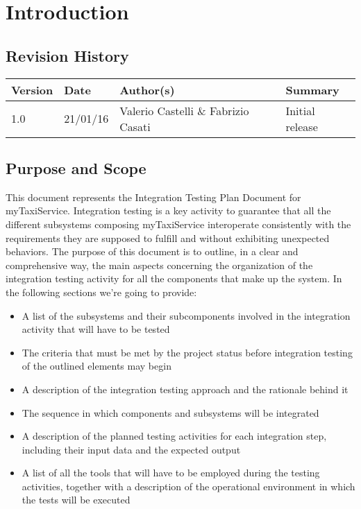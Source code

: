 \chapter{Introduction}
\section{Revision History}
\begin{center}
\begin{longtable}{|l|l|l|l|}
\hline
Version &
Date &
Author(s) &
Summary \\
\hline
1.0 &
21/01/16 &
Valerio Castelli \& Fabrizio Casati &
Initial release \\
\hline
\end{longtable}
\end{center}

\section{Purpose and Scope}
This document represents the Integration Testing Plan Document for myTaxiService. 
Integration testing is a key activity to guarantee that all the different subsystems composing myTaxiService interoperate consistently with the requirements they are supposed to fulfill and without exhibiting unexpected behaviors. 
The purpose of this document is to outline, in a clear and comprehensive way, the main aspects concerning the organization of the integration testing activity for all the components that make up the system.
In the following sections we're going to provide:
\begin{itemize}
	\item A list of the subsystems and their subcomponents involved in the integration activity that will have to be tested
	\item The criteria that must be met by the project status before integration testing of the outlined elements may begin 
	\item A description of the integration testing approach and the rationale behind it
	\item The sequence in which components and subsystems will be integrated 
	\item A description of the planned testing activities for each integration step, including their input data and the expected output 
	\item A list of all the tools that will have to be employed during the testing activities, together with a description of the operational environment in which the tests will be executed
\end{itemize}
